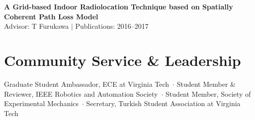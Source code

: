 \documentclass[letterpaper,11pt]{article}
\begin{document}

		\resumeProjectHeading
		{
		\textbf{A Grid-based Indoor Radiolocation Technique based on Spatially Coherent Path Loss Model} \\
			\qquad \small Advisor: T Furukawa $|$ Publications: \cite{ambarkutuk2017grid}
		}
		{2016--2017}
		\resumeItemListStart
		\resumeItemListEnd
    \resumeSubHeadingListEnd
	\vspace{-15pt}


{
	\footnotesize
	
}

\section{Community Service \& Leadership}
	\vspace{-3pt}
	{\small Graduate Student Ambassador, ECE at Virginia Tech~$\cdot$ Student Member \& Reviewer, IEEE Robotics and Automation Society~$\cdot$ Student Member, Society of Experimental Mechanics~$\cdot$ Secretary, Turkish Student Association at Virginia Tech}
\end{document}
